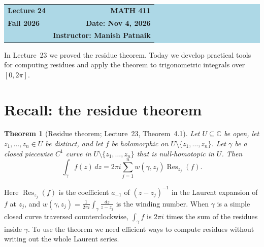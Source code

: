 \documentclass[11pt]{article}
\theoremstyle{plain}
\newtheorem{theorem}{Theorem}[section]
\theoremstyle{definition}
\theoremstyle{boldremark}
\theoremstyle{remark}
\numberwithin{equation}{section}
\newcommand{\C}{\mathbb{C}}
\begin{document}
\begin{center}
  \colorbox{lightblue}{%
    \begin{minipage}{0.94\textwidth}
      \vspace{0.55em}
      \begin{tabular*}{\textwidth}{@{\extracolsep{\fill}}lr}
        {\color{courseblue}\bfseries\LARGE Lecture 24} &
        {\color{courseblue}\bfseries\LARGE MATH 411}\\[0.35em]
        \textbf{Fall 2026} & \textbf{Date: Nov 4, 2026}\\
        & \textbf{Instructor: Manish Patnaik}
      \end{tabular*}
      \vspace{0.45em}
    \end{minipage}}
\end{center}

\setcounter{tocdepth}{1}
\tableofcontents
\vspace{0.45em}

In Lecture~23 we proved the residue theorem. Today we develop practical
tools for computing residues and apply the theorem to trigonometric
integrals over $[0,2\pi]$.

\section{Recall: the residue theorem}
\begin{theorem}[Residue theorem; Lecture~23, Theorem~4.1]\label{thm:residue}
Let $U\subseteq\C$ be open, let $z_1,\dots,z_n\in U$ be distinct, and let
$f$ be holomorphic on $U\setminus\{z_1,\dots,z_n\}$. Let $\gamma$ be a closed
piecewise $C^1$ curve in $U\setminus\{z_1,\dots,z_n\}$ that is
null-homotopic in $U$. Then
\[
 \boxed{\displaystyle\int_\gamma f(z)\,dz
 =2\pi i\sum_{j=1}^{n}w(\gamma,z_j)\operatorname{Res}_{z_j}(f).}
\]
\end{theorem}
Here $\operatorname{Res}_{z_j}(f)$ is the coefficient $a_{-1}$ of
$(z-z_j)^{-1}$ in the Laurent expansion of $f$ at $z_j$, and
$w(\gamma,z_j)=\frac{1}{2\pi i}\int_\gamma\frac{dz}{z-z_j}$ is the winding
number. When $\gamma$ is a simple closed curve traversed counterclockwise,
$\int_\gamma f$ is $2\pi i$ times the sum of the residues inside $\gamma$.
To use the theorem we need efficient ways to compute residues without
writing out the whole Laurent series.
\end{document}

